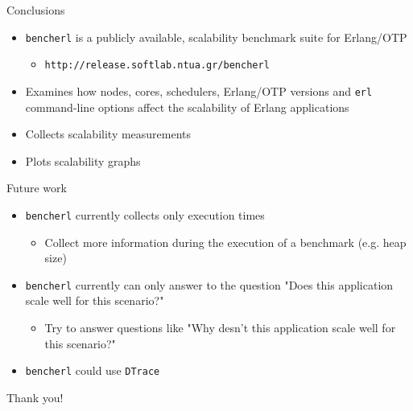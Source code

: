 \documentclass{beamer}
\begin{document}
\begin{frame}[t]{Conclusions}
	\begin{itemize}
		\item \texttt{bencherl} is a publicly available, \textcolor{burgundy}{scalability} benchmark suite for Erlang/OTP
			\begin{itemize}
				\item \texttt{http://release.softlab.ntua.gr/bencherl}
			\end{itemize} 
		\item Examines how \textcolor{burgundy}{nodes}, \textcolor{burgundy}{cores}, \textcolor{burgundy}{schedulers}, \textcolor{burgundy}{Erlang/OTP versions} and \textcolor{burgundy}{\texttt{erl} command-line options} affect the scalability of Erlang applications
		\item Collects \textcolor{burgundy}{scalability measurements}
		\item Plots \textcolor{burgundy}{scalability graphs}
	\end{itemize}
\end{frame}

\begin{frame}[t]{Future work}
	\begin{itemize}
		\item \texttt{bencherl} currently collects only execution times
			\begin{itemize}
				\item Collect \textcolor{burgundy}{more information} during the execution of a benchmark (e.g. heap size)
			\end{itemize}
		\item \texttt{bencherl} currently can only answer to the question "Does this application scale well for this scenario?"
            \begin{itemize}
            	\item Try to answer questions like "\textcolor{burgundy}{Why} desn't this application scale well for this scenario?" 
			\end{itemize}
		\item \texttt{bencherl} could use \textcolor{burgundy}{\texttt{DTrace}}
	\end{itemize}
\end{frame}

\begin{frame}
	\vspace{50pt}
	\begin{center}
	Thank you!
	\end{center}
\end{frame}
\end{document}
